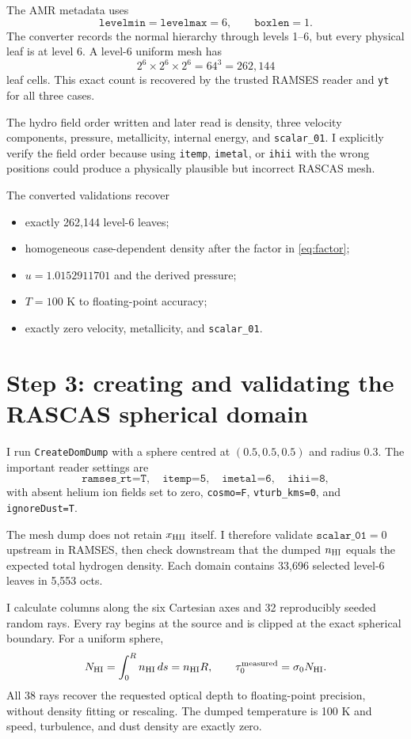 \documentclass[11pt,a4paper]{article}
\newcommand{\tauzero}{\tau_0}
\newcommand{\nhi}{n_{\rm HI}}
\begin{document}
The AMR metadata uses
\[
\texttt{levelmin}=\texttt{levelmax}=6,\qquad \texttt{boxlen}=1.
\]
The converter records the normal hierarchy through levels 1--6, but every
physical leaf is at level 6.  A level-6 uniform mesh has
\[
2^6\times2^6\times2^6=64^3=262,144
\]
leaf cells.  This exact count is recovered by the trusted RAMSES reader and
\texttt{yt} for all three cases.

The hydro field order written and later read is density, three velocity
components, pressure, metallicity, internal energy, and
\texttt{scalar\_01}.  I explicitly verify the field order because using
\texttt{itemp}, \texttt{imetal}, or \texttt{ihii} with the wrong positions
could produce a physically plausible but incorrect RASCAS mesh.

The converted validations recover
\begin{itemize}
\item exactly 262,144 level-6 leaves;
\item homogeneous case-dependent density after the factor in \ref{eq:factor};
\item $u=1.0152911701$ and the derived pressure;
\item $T=100$ K to floating-point accuracy;
\item exactly zero velocity, metallicity, and \texttt{scalar\_01}.
\end{itemize}

\section{Step 3: creating and validating the RASCAS spherical domain}

I run \texttt{CreateDomDump} with a sphere centred at $(0.5,0.5,0.5)$ and
radius 0.3.  The important reader settings are
\[
\texttt{ramses\_rt=T},\quad \texttt{itemp=5},\quad
\texttt{imetal=6},\quad \texttt{ihii=8},
\]
with absent helium ion fields set to zero, \texttt{cosmo=F},
\texttt{vturb\_kms=0}, and \texttt{ignoreDust=T}.

The mesh dump does not retain $x_{\rm HII}$ itself.  I therefore validate
$\texttt{scalar\_01}=0$ upstream in RAMSES, then check downstream that the
dumped $\nhi$ equals the expected total hydrogen density.  Each domain contains
33,696 selected level-6 leaves in 5,553 octs.

I calculate columns along the six Cartesian axes and 32 reproducibly seeded
random rays.  Every ray begins at the source and is clipped at the exact
spherical boundary.  For a uniform sphere,
\begin{equation}
N_{\rm HI}=\int_0^R \nhi\,ds=\nhi R,
\qquad
\tauzero^{\rm measured}=\sigma_0 N_{\rm HI}.
\end{equation}
All 38 rays recover the requested optical depth to floating-point precision,
without density fitting or rescaling.  The dumped temperature is 100 K and
speed, turbulence, and dust density are exactly zero.
\end{document}
